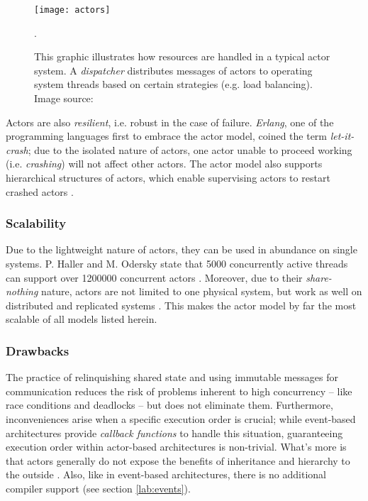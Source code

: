 \begin{figure}
\centering\small
\setlength{\tabcolsep}{0mm}
  \texttt{[image: actors]}
\caption{This graphic illustrates how resources are handled in a typical actor system. A \textit{dispatcher} distributes messages of actors to operating system threads based on certain strategies (e.g. load balancing). Image source: \cite{Gupta2012}}.
\label{fig:gil}
\end{figure}

Actors are also \textit{resilient}, i.e. robust in the case of failure. \textit{Erlang}, one of the programming languages first to embrace the actor model, coined the term \textit{let-it-crash}; due to the isolated nature of actors, one actor unable to proceed working (i.e. \textit{crashing}) will not affect other actors. The actor model also supports hierarchical structures of actors, which enable supervising actors to restart crashed actors \cite{Armstrong2007}.

\subsubsection*{Scalability}
Due to the lightweight nature of actors, they can be used in abundance on single systems. P. Haller and M. Odersky state that 5000 concurrently active threads can support over 1200000 concurrent actors \cite[p. 2]{Haller2009}. Moreover, due to their \textit{share-nothing} nature, actors are not limited to one physical system, but work as well on distributed and replicated systems \cite[p. 233]{Gupta2012}. This makes the actor model by far the most scalable of all models listed herein. 

\subsubsection*{Drawbacks}
The practice of relinquishing shared state and using immutable messages for communication reduces the risk of problems inherent to high concurrency -- like race conditions and deadlocks -- but does not eliminate them. Furthermore, inconveniences arise when a specific execution order is crucial; while event-based architectures provide \textit{callback functions} to handle this situation, guaranteeing execution order within actor-based architectures is non-trivial. What's more is that actors generally do not expose the benefits of inheritance and hierarchy to the outside \cite{Mackay97}. Also, like in event-based architectures, there is no additional compiler support (see section \ref{lab:events}).
